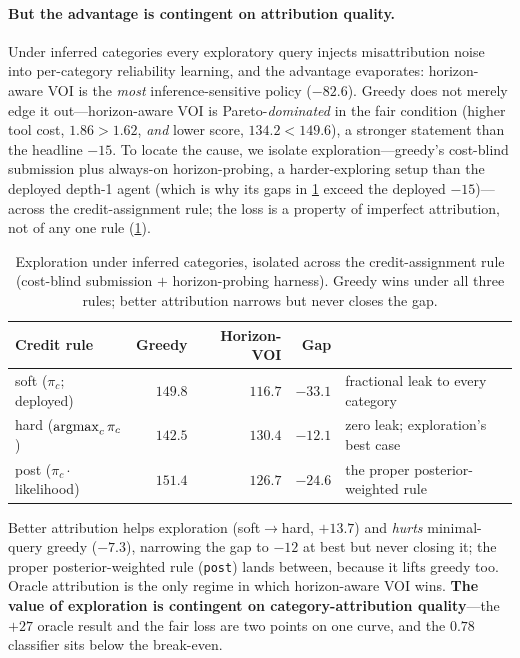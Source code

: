 \documentclass[11pt]{article}
\newcommand{\argmax}{\operatornamewithlimits{argmax}}
\begin{document}
\paragraph{But the advantage is contingent on attribution quality.} Under inferred categories every exploratory query injects misattribution noise into per-category reliability learning, and the advantage evaporates: horizon-aware VOI is the \emph{most} inference-sensitive policy ($-82.6$). Greedy does not merely edge it out---horizon-aware VOI is Pareto-\emph{dominated} in the fair condition (higher tool cost, $1.86 > 1.62$, \emph{and} lower score, $134.2 < 149.6$), a stronger statement than the headline $-15$. To locate the cause, we isolate exploration---greedy's cost-blind submission plus always-on horizon-probing, a harder-exploring setup than the deployed depth-1 agent (which is why its gaps in \cref{tab:credit} exceed the deployed $-15$)---across the credit-assignment rule; the loss is a property of imperfect attribution, not of any one rule (\cref{tab:credit}).

\begin{table}[t]
\centering
\caption{Exploration under inferred categories, isolated across the credit-assignment rule (cost-blind submission $+$ horizon-probing harness). Greedy wins under all three rules; better attribution narrows but never closes the gap.}
\label{tab:credit}
\small
\begin{tabular}{@{}lrrrl@{}}
\toprule
Credit rule & Greedy & Horizon-VOI & Gap & \\
\midrule
soft ($\pi_c$; deployed) & $149.8$ & $116.7$ & $-33.1$ & fractional leak to every category \\
hard ($\argmax_c \pi_c$) & $142.5$ & $130.4$ & $\mathbf{-12.1}$ & zero leak; exploration's best case \\
post ($\pi_c \cdot$ likelihood) & $151.4$ & $126.7$ & $-24.6$ & the proper posterior-weighted rule \\
\bottomrule
\end{tabular}
\end{table}

Better attribution helps exploration (soft$\to$hard, $+13.7$) and \emph{hurts} minimal-query greedy ($-7.3$), narrowing the gap to $-12$ at best but never closing it; the proper posterior-weighted rule (\texttt{post}) lands between, because it lifts greedy too. Oracle attribution is the only regime in which horizon-aware VOI wins. \textbf{The value of exploration is contingent on category-attribution quality}---the $+27$ oracle result and the fair loss are two points on one curve, and the $0.78$ classifier sits below the break-even.
\end{document}
